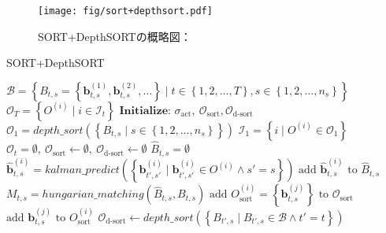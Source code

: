         \begin{figure}[t]
            \centering
            \texttt{[image: fig/sort+depthsort.pdf]}
            \caption[SORT+DepthSORTの概略図]{SORT+DepthSORTの概略図：}
            \label{fig:sort_depthsort}
        \end{figure}

        \begin{algorithm}[t]
            \caption{SORT+DepthSORT}
            \label{alg:sort_depthsort}
            \small
            \begin{algorithmic}[1]
                \Require $\mathcal{B} = \left\{B_{t,s} = \left\{\bm{b}_{t,s}^{(1)}, \bm{b}_{t,s}^{(2)}, \dots\right\} \mid t \in \left\{1, 2, \dots, T\right\}, s \in \left\{1, 2, \dots, n_s\right\}\right\}$
                \Ensure $\mathcal{O}_T = \left\{O^{(i)} \mid i \in \mathcal{I}_t\right\}$
                \State $\textbf{Initialize: } \sigma_{\text{act}},\ \mathcal{O}_{\text{sort}}, \mathcal{O}_{\text{d-sort}}$
                \State $\mathcal{O}_1 = depth\_sort(\left\{B_{t, s} \mid s \in \left\{1, 2, \dots, n_s\right\}\right\})$
                \State $\mathcal{I}_1 = \left\{i \mid O^{(i)} \in \mathcal{O}_1\right\}$
                    \State $\mathcal{O}_t = \emptyset,\ \mathcal{O}_{\text{sort}} \gets \emptyset,\ \mathcal{O}_{\text{d-sort}} \gets \emptyset$
                        \State $\hat{B}_{t,s} = \emptyset$
                            \State $\hat{\bm{b}}_{t,s}^{(i)} = kalman\_predict\left(\left\{\bm{b}_{t',s'}^{(i)} \mid \bm{b}_{t',s'}^{(i)} \in O^{(i)} \land s' = s\right\}\right)$
                            \State $\text{add } \hat{\bm{b}}_{t,s}^{(i)} \text{ to }\hat{B}_{t,s}$
                        \EndFor
                        \State $M_{t,s} = hungarian\_matching(\hat{B}_{t,s}, B_{t,s})$
                                \State $\text{add } O_{\text{sort}}^{(i)} = \left\{\bm{b}_{t,s}^{(j)}\right\} \text{ to } \mathcal{O}_{\text{sort}}$
                            \Else
                                \State $\text{add } \bm{b}_{t,s}^{(j)} \text{ to } O_{\text{sort}}^{(i)}$
                            \EndIf
                        \EndFor
                    \EndFor 
                    \State $\mathcal{O}_{\text{d-sort}} \gets depth\_sort\left(\left\{B_{t',s} \mid B_{t',s} \in \mathcal{B} \land t' = t\right\}\right)$

\end{algorithmic}
\end{algorithm}
